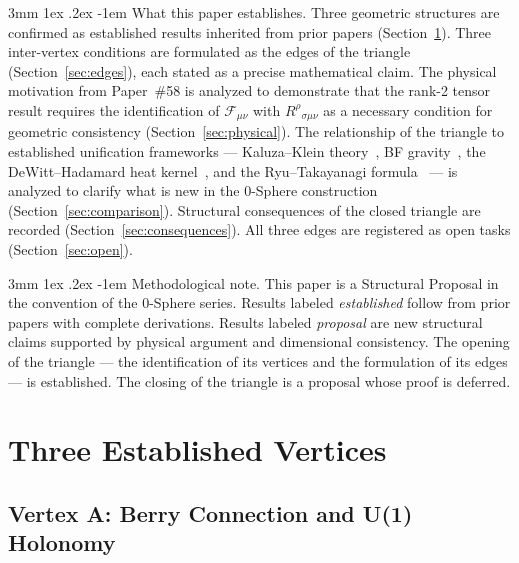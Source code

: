 \documentclass[%
 reprint, amsmath,amssymb, aps, prd, ]{revtex4-2}
\makeatletter
\numberwithin{equation}{section}
\renewcommand\paragraph{%
  \@startsection{paragraph}{4}{\z@}%
    {3mm \@plus 1ex \@minus .2ex}%
    {-1em}%
    {\normalfont\normalsize\itshape}}
\newcommand{\BerryF}{\mathcal{F}}
\makeatother
\begin{document}
\paragraph{What this paper establishes.}
Three geometric structures are confirmed as established results inherited from prior papers (Section~\ref{sec:vertices}).
Three inter-vertex conditions are formulated as the edges of the triangle (Section~\ref{sec:edges}), each stated as a precise mathematical claim.
The physical motivation from Paper~\#58 is analyzed to demonstrate that the rank-2 tensor result requires the identification of $\BerryF_{\mu\nu}$ with $R^\rho{}_{\sigma\mu\nu}$ as a necessary condition for geometric consistency (Section~\ref{sec:physical}).
The relationship of the triangle to established unification frameworks --- Kaluza--Klein theory~\cite{Kaluza1921,Klein1926}, BF gravity~\cite{Plebanski1977}, the DeWitt--Hadamard heat kernel~\cite{DeWitt1965,Hadamard1923}, and the Ryu--Takayanagi formula~\cite{RyuTakayanagi2006} --- is analyzed to clarify what is new in the 0-Sphere construction (Section~\ref{sec:comparison}).
Structural consequences of the closed triangle are recorded (Section~\ref{sec:consequences}).
All three edges are registered as open tasks (Section~\ref{sec:open}).

\paragraph{Methodological note.}
This paper is a Structural Proposal in the convention of the 0-Sphere series.
Results labeled \emph{established} follow from prior papers with complete derivations.
Results labeled \emph{proposal} are new structural claims supported by physical argument and dimensional consistency.
The opening of the triangle --- the identification of its vertices and the formulation of its edges --- is established.
The closing of the triangle is a proposal whose proof is deferred.

\section{Three Established Vertices}
\label{sec:vertices}

\subsection{Vertex A: Berry Connection and U(1) Holonomy}
\label{subsec:vertexA}
\end{document}
